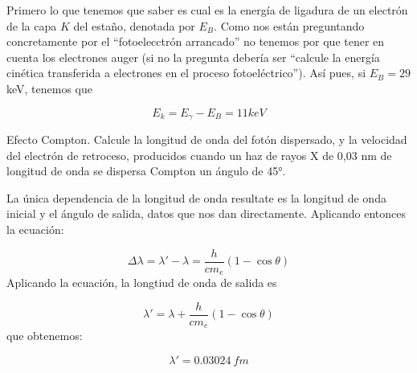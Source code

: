 Primero lo que tenemos que saber es cual es la energía de ligadura de un electrón de la capa $K$ del estaño, denotada por $E_B$. Como nos están preguntando concretamente por el ``fotoelecctrón arrancado'' no tenemos por que tener en cuenta los electrones auger (si no la pregunta debería ser ``calcule la energía cinética transferida a electrones en el proceso fotoeléctrico''). Así pues, si $E_B=29$ keV, tenemos que 

\begin{equation}
    E_k = E_{\gamma} - E_B = 11 \unit{keV}
\end{equation}



\begin{Ejercicio}{Efecto Compton.}
    Calcule la longitud de onda del fotón dispersado, y la velocidad del electrón de retroceso, producidos cuando un haz de rayos X de 0,03 nm de longitud de onda se dispersa Compton un ángulo de 45°.
\end{Ejercicio}

La única dependencia de la longitud de onda resultate es la longitud de onda inicial y el ángulo de salida, datos que nos dan directamente. Aplicando entonces la ecuación: 

\begin{equation}
    \Delta \lambda = \lambda'-\lambda = \frac{h}{cm_e}(1-\cos \theta) 
\end{equation}
Aplicando la ecuación, la longtiud de onda de salida es

\begin{equation}
    \lambda' = \lambda + \frac{h}{cm_e} (1-\cos \theta)
\end{equation}
que obtenemos: 

\begin{equation}
    \lambda' = 0.03024 \ \unit{fm}
\end{equation}


